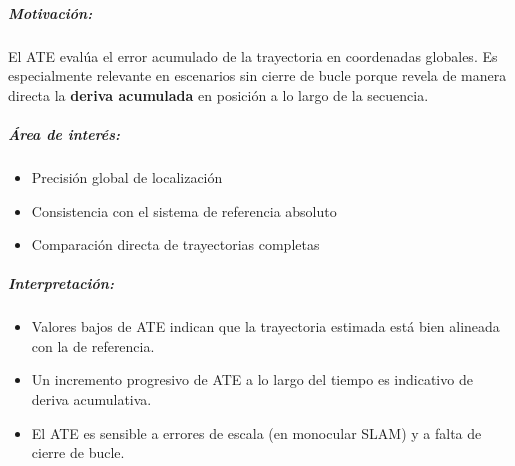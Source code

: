 \documentclass[12pt, a4paper, twoside]{article}
\begin{document}
\subparagraph{Motivación:}
El ATE evalúa el error acumulado de la trayectoria en coordenadas globales.
Es especialmente relevante en escenarios sin cierre de bucle porque 
revela de manera directa la \textbf{deriva acumulada} en posición a lo largo de la secuencia.

\subparagraph{Área de interés:}
\begin{itemize}
  \item Precisión global de localización
  \item Consistencia con el sistema de referencia absoluto
  \item Comparación directa de trayectorias completas
\end{itemize}

\subparagraph{Interpretación:}
\begin{itemize}
  \item Valores bajos de ATE indican que la trayectoria estimada está bien alineada con la de referencia.
  \item Un incremento progresivo de ATE a lo largo del tiempo es indicativo de deriva acumulativa.
  \item El ATE es sensible a errores de escala (en monocular SLAM) y a falta de cierre de bucle.
\end{itemize}
\end{document}
